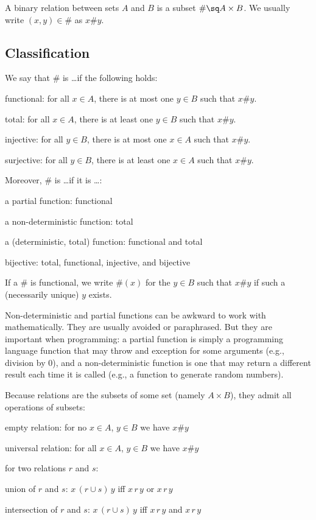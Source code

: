 A binary relation between sets $A$ and $B$ is a subset $\#\sq A\times B$.
We usually write $(x,y)\in\#$ as $x\# y$.

\subsection{Classification}

\begin{definition}\label{def:math:rel}
We say that $\#$ is \ldots if the following holds:
 \begin{compactitem}
 \item functional: for all $x\in A$, there is at most one $y\in B$ such that $x\# y$.
 \item total: for all $x\in A$, there is at least one $y\in B$ such that $x\# y$.
 \item injective: for all $y\in B$, there is at most one $x\in A$ such that $x\# y$.
 \item surjective: for all $y\in B$, there is at least one $x\in A$ such that $x\# y$.
 \end{compactitem}

Moreover, $\#$ is \ldots if it is \ldots:
 \begin{compactitem}
 \item a partial function: functional
 \item a non-deterministic function: total
 \item a (deterministic, total) function: functional and total
 \item bijective: total, functional, injective, and bijective
 \end{compactitem}

If a $\#$ is functional, we write $\#(x)$ for the $y\in B$ such that $x\# y$ if such a (necessarily unique) $y$ exists.
\end{definition}

Non-deterministic and partial functions can be awkward to work with mathematically.
They are usually avoided or paraphrased.
But they are important when programming: a partial function is simply a programming language function that may throw and exception for some arguments (e.g., division by $0$), and a non-deterministic function is one that may return a different result each time it is called (e.g., a function to generate random numbers).

Because relations are the subsets of some set (namely $A\times B$), they admit all operations of subsets:
\begin{compactitem}
 \item empty relation: for no $x\in A$, $y\in B$ we have $x\# y$
 \item universal relation: for all $x\in A$, $y\in B$ we have $x\# y$
 \item for two relations $r$ and $s$:
  \begin{compactitem}
   \item union of $r$ and $s$: $x\,(r\cup s)\,y$ iff $x\,r\,y$ or $x\,r\,y$ 
   \item intersection of $r$ and $s$: $x\,(r\cup s)\,y$ iff $x\,r\,y$ and $x\,r\,y$
  \end{compactitem}
\end{compactitem}

